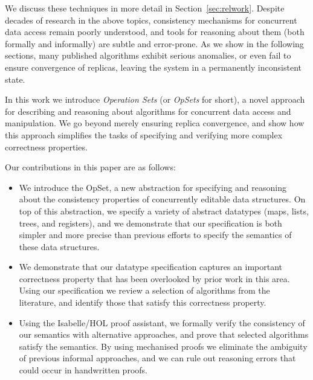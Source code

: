 \documentclass[11pt]{article}
\begin{document}
We discuss these techniques in more detail in Section~\ref{sec:relwork}.
Despite decades of research in the above topics, consistency mechanisms for concurrent data access remain poorly understood, and tools for reasoning about them (both formally and informally) are subtle and error-prone.
As we show in the following sections, many published algorithms exhibit serious anomalies, or even fail to ensure convergence of replicas, leaving the system in a permanently inconsistent state.

In this work we introduce \emph{Operation Sets} (or \emph{OpSets} for short), a novel approach for describing and reasoning about algorithms for concurrent data access and manipulation.
We go beyond merely ensuring replica convergence, and show how this approach simplifies the tasks of specifying and verifying more complex correctness properties.

Our contributions in this paper are as follows:

\begin{itemize}
\item We introduce the OpSet, a new abstraction for specifying and reasoning about the consistency properties of concurrently editable data structures.
On top of this abstraction, we specify a variety of abstract datatypes (maps, lists, trees, and registers), and we demonstrate that our specification is both simpler and more precise than previous efforts to specify the semantics of these data structures.

\item We demonstrate that our datatype specification captures an important correctness property that has been overlooked by prior work in this area.
Using our specification we review a selection of algorithms from the literature, and identify those that satisfy this correctness property.

\item Using the Isabelle/HOL proof assistant, we formally verify the consistency of our semantics with alternative approaches, and prove that selected algorithms satisfy the semantics.
By using mechanised proofs we eliminate the ambiguity of previous informal approaches, and we can rule out reasoning errors that could occur in handwritten proofs.
\end{itemize}








{\footnotesize

{}}
\end{document}
